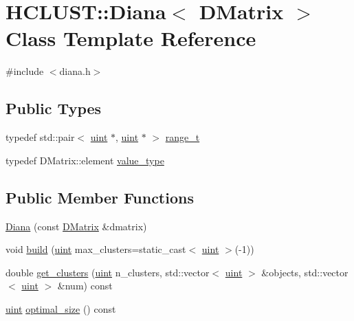 \hypertarget{class_h_c_l_u_s_t_1_1_diana}{\section{H\+C\+L\+U\+S\+T\+:\+:Diana$<$ D\+Matrix $>$ Class Template Reference}
\label{class_h_c_l_u_s_t_1_1_diana}
}


{\ttfamily \#include $<$diana.\+h$>$}

\subsection*{Public Types}
\begin{DoxyCompactItemize}
\item 
typedef std\+::pair$<$ \hyperlink{cyktable_8h_a91ad9478d81a7aaf2593e8d9c3d06a14}{uint} $\ast$, \hyperlink{cyktable_8h_a91ad9478d81a7aaf2593e8d9c3d06a14}{uint} $\ast$ $>$ \hyperlink{class_h_c_l_u_s_t_1_1_diana_acb3ccd562a49bbb37f4fbf540a758746}{range\+\_\+t}
\item 
typedef D\+Matrix\+::element \hyperlink{class_h_c_l_u_s_t_1_1_diana_a8f73768241022b8bb0b5ab3dfb448efc}{value\+\_\+type}
\end{DoxyCompactItemize}
\subsection*{Public Member Functions}
\begin{DoxyCompactItemize}
\item 
\hyperlink{class_h_c_l_u_s_t_1_1_diana_abfbe99b4e37a6d612fb924fc0c79d740}{Diana} (const \hyperlink{diana_8cpp_a24ccaa68296c807210db27b4429f03c9}{D\+Matrix} \&dmatrix)
\item 
void \hyperlink{class_h_c_l_u_s_t_1_1_diana_ad54111188e28d611d54a1d0c800066eb}{build} (\hyperlink{cyktable_8h_a91ad9478d81a7aaf2593e8d9c3d06a14}{uint} max\+\_\+clusters=static\+\_\+cast$<$ \hyperlink{cyktable_8h_a91ad9478d81a7aaf2593e8d9c3d06a14}{uint} $>$(-\/1))
\item 
double \hyperlink{class_h_c_l_u_s_t_1_1_diana_a1ffa64d53eaf8de94210eac13dc4c708}{get\+\_\+clusters} (\hyperlink{cyktable_8h_a91ad9478d81a7aaf2593e8d9c3d06a14}{uint} n\+\_\+clusters, std\+::vector$<$ \hyperlink{cyktable_8h_a91ad9478d81a7aaf2593e8d9c3d06a14}{uint} $>$ \&objects, std\+::vector$<$ \hyperlink{cyktable_8h_a91ad9478d81a7aaf2593e8d9c3d06a14}{uint} $>$ \&num) const 
\item 
\hyperlink{cyktable_8h_a91ad9478d81a7aaf2593e8d9c3d06a14}{uint} \hyperlink{class_h_c_l_u_s_t_1_1_diana_aed9c1e18a682886ca439cd8fff2bd8fe}{optimal\+\_\+size} () const 
\end{DoxyCompactItemize}


